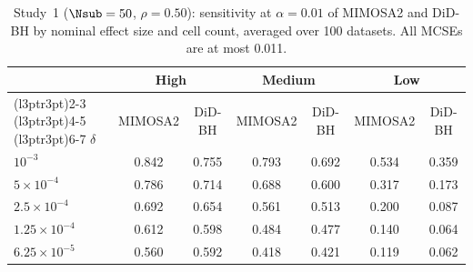 \begin{table}[!h]
\centering
\caption{Study~1 ($\Nsub = 50$, $\rho = 0.50$): sensitivity at $\alpha = 0.01$ of MIMOSA2 and DiD-BH by nominal effect size and cell count, averaged over 100 datasets. All MCSEs are at most 0.011.\label{tbl_baseline_summary_P50_sensitivity}}
\centering
\begin{tabular}[t]{lcccccc}
\toprule
\multicolumn{1}{c}{ } & \multicolumn{2}{c}{High} & \multicolumn{2}{c}{Medium} & \multicolumn{2}{c}{Low} \\
\cmidrule(l{3pt}r{3pt}){2-3} \cmidrule(l{3pt}r{3pt}){4-5} \cmidrule(l{3pt}r{3pt}){6-7}
$\delta$ & MIMOSA2 & DiD-BH & MIMOSA2 & DiD-BH & MIMOSA2 & DiD-BH\\
\midrule
$10^{-3}$ & 0.842 & 0.755 & 0.793 & 0.692 & 0.534 & 0.359\\
$5\times10^{-4}$ & 0.786 & 0.714 & 0.688 & 0.600 & 0.317 & 0.173\\
$2.5\times10^{-4}$ & 0.692 & 0.654 & 0.561 & 0.513 & 0.200 & 0.087\\
$1.25\times10^{-4}$ & 0.612 & 0.598 & 0.484 & 0.477 & 0.140 & 0.064\\
$6.25\times10^{-5}$ & 0.560 & 0.592 & 0.418 & 0.421 & 0.119 & 0.062\\
\bottomrule
\end{tabular}
\end{table}
